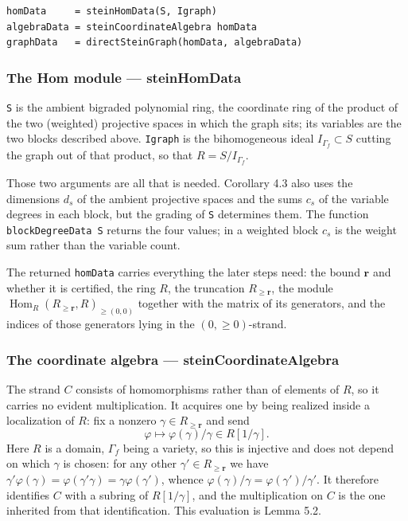 \documentclass[11pt,reqno]{amsart}
\DeclareMathOperator{\Hom}{Hom}
\theoremstyle{plain}
\theoremstyle{definition}
\begin{document}
\begin{verbatim}
homData     = steinHomData(S, Igraph)
algebraData = steinCoordinateAlgebra homData
graphData   = directSteinGraph(homData, algebraData)
\end{verbatim}

\subsubsection*{The Hom module ---
  \texorpdfstring{{\normalfont\ttfamily steinHomData}}{steinHomData}}

\texttt{S} is the ambient bigraded polynomial ring, the coordinate ring
of the product of the two (weighted) projective spaces in which the graph
sits; its variables are the two blocks described above.
\texttt{Igraph} is the bihomogeneous ideal \(I_{\Gamma_f}\subset S\)
cutting the graph out of that product, so that \(R=S/I_{\Gamma_f}\). 

Those two arguments are all that is needed. Corollary 4.3 also uses the
dimensions \(d_s\) of the ambient projective spaces and the sums \(c_s\) of
the variable degrees in each block, but the grading of \texttt{S} determines
them.  The function \texttt{blockDegreeData S} returns the four values; in a
weighted block \(c_s\) is the weight sum rather than the variable count.

The returned \texttt{homData} carries everything the later steps need: the
bound \(\mathbf{r}\) and whether it is certified, the ring \(R\), the
truncation \(R_{\geq\mathbf{r}}\), the module
\(\Hom_R(R_{\geq\mathbf{r}},R)_{\geq(0,0)}\) together with the matrix of its
generators, and the indices of those generators lying in the
\((0,\geq0)\)-strand.

\subsubsection*{The coordinate algebra ---
  \texorpdfstring{{\normalfont\ttfamily steinCoordinateAlgebra}}{steinCoordinateAlgebra}}

The strand \(C\) consists of homomorphisms rather than of elements of
\(R\), so it carries no evident multiplication. It acquires one by being
realized inside a localization of \(R\): fix a nonzero
\(\gamma\in R_{\geq\mathbf{r}}\) and send
\[\varphi\longmapsto\varphi(\gamma)/\gamma\in R[1/\gamma].\]
Here \(R\) is a domain, \(\Gamma_f\) being a variety, so this is injective
and does not depend on which \(\gamma\) is chosen: for any other
\(\gamma'\in R_{\geq\mathbf{r}}\) we have
\(\gamma'\varphi(\gamma)=\varphi(\gamma'\gamma)=\gamma\varphi(\gamma')\),
whence \(\varphi(\gamma)/\gamma=\varphi(\gamma')/\gamma'\). It therefore
identifies \(C\) with a subring of \(R[1/\gamma]\), and the multiplication
on \(C\) is the one inherited from that identification. This evaluation is
Lemma 5.2.
\end{document}
